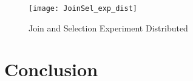 \documentclass[11pt,a4paper,bibtotoc,idxtotoc,headsepline,footsepline,footexclude,BCOR12mm,DIV13]{scrbook}
\begin{document}

\begin{figure}
	\centering
	\texttt{[image: JoinSel\_exp\_dist]}
	\caption{Join and Selection Experiment Distributed}
	\label{sec:JoinSelExpDist}
	
\end{figure} 


\chapter{Conclusion}
\label{Conclusion}
\end{document}
